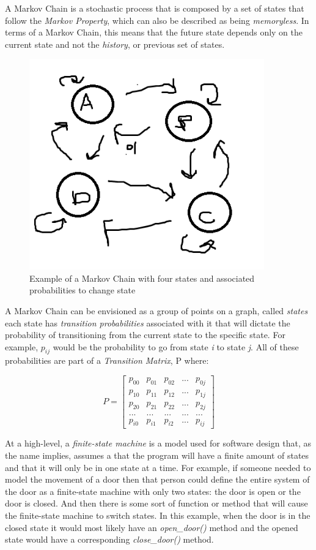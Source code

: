 \documentclass{article}
\begin{document}
A Markov Chain is a stochastic process that is composed by a set of states that follow the \textit{Markov Property}, which can also be described as being \textit{memoryless}.  In terms of a Markov Chain, this means that the future state depends only on the current state and not the \textit{history}, or previous set of states.

\begin{figure}
    \centering
    \includegraphics[width=4.0in]{betamarkovchain}
    \caption{Example of a Markov Chain with four states and associated probabilities to change state}
    \label{example_markov_chain}
\end{figure}

A Markov Chain can be envisioned as a group of points on a graph, called \textit{states} each state has \textit{transition probabilities} associated with it that will dictate the probability of transitioning from the current state to the specific state.  For example,  $p_{ij}$ would be the probability to go from state \textit{i} to state \textit{j}.  All of these probabilities are part of a \textit{Transition Matrix}, P where:

$$
P=
\begin{bmatrix}
p_{00} & p_{01} & p_{02} & ... & p_{0j}\\
p_{10} & p_{11} & p_{12} & ... & p_{1j}\\
p_{20} & p_{21} & p_{22} & ... & p_{2j}\\
... & ... & ... & ... & ...\\
p_{i0} & p_{i1} & p_{i2} & ... & p_{ij}
\end{bmatrix}
$$

At a high-level, a \textit{finite-state machine} is a model used for software design that, as the name implies, assumes a that the program will have a finite amount of states and that it will only be in one state at a time.  For example, if someone needed to model the movement of a door then that person could define the entire system of the door as a finite-state machine with only two states: the door is open or the door is closed.  And then there is some sort of function or method that will cause the finite-state machine to switch states.  In this example, when the door is in the closed state it would most likely have an \textit{open_door()} method and the opened state would have a corresponding \textit{close_door()} method.
\end{document}
